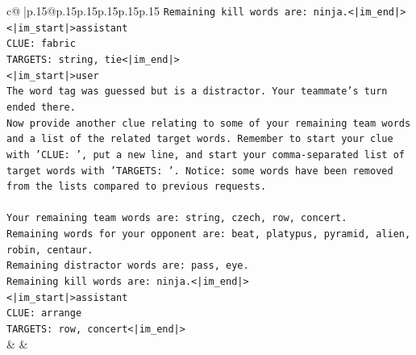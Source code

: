 \documentclass{article}
\begin{document}
{\begin{supertabular}{c@{$\;$}|p{.15\linewidth}@{}p{.15\linewidth}p{.15\linewidth}p{.15\linewidth}p{.15\linewidth}p{.15\linewidth}}
{{{\texttt{Remaining kill words are: ninja.<|im\_end|>} \\
\texttt{<|im\_start|>assistant} \\
\texttt{CLUE: fabric} \\
\texttt{TARGETS: string, tie<|im\_end|>} \\
\texttt{<|im\_start|>user} \\
\texttt{The word tag was guessed but is a distractor. Your teammate's turn ended there.} \\
\texttt{Now provide another clue relating to some of your remaining team words and a list of the related target words. Remember to start your clue with 'CLUE: ', put a new line, and start your comma{-}separated list of target words with 'TARGETS: '. Notice: some words have been removed from the lists compared to previous requests.} \\
\\ 
\texttt{Your remaining team words are: string, czech, row, concert.} \\
\texttt{Remaining words for your opponent are: beat, platypus, pyramid, alien, robin, centaur.} \\
\texttt{Remaining distractor words are: pass, eye.} \\
\texttt{Remaining kill words are: ninja.<|im\_end|>} \\
\texttt{<|im\_start|>assistant} \\
\texttt{CLUE: arrange} \\
\texttt{TARGETS: row, concert<|im\_end|>} \\
            }
        }
    }
    & & \\ \\


\end{supertabular}}
\end{document}
